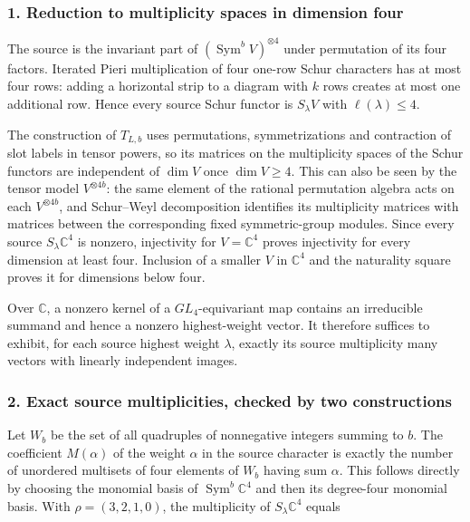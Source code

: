 \documentclass[
  10pt,
]{article}
\begin{document}
\subsubsection{1. Reduction to multiplicity spaces in dimension
four}\label{reduction-to-multiplicity-spaces-in-dimension-four}

The source is the invariant part of
\((\operatorname{Sym}^b V)^{\otimes4}\) under permutation of its four
factors. Iterated Pieri multiplication of four one-row Schur characters
has at most four rows: adding a horizontal strip to a diagram with \(k\)
rows creates at most one additional row. Hence every source Schur
functor is \(S_\lambda V\) with \(\ell(\lambda)\le4\).

The construction of \(T_{L,b}\) uses permutations, symmetrizations and
contraction of slot labels in tensor powers, so its matrices on the
multiplicity spaces of the Schur functors are independent of \(\dim V\)
once \(\dim V\ge4\). This can also be seen by the tensor model
\(V^{\otimes4b}\): the same element of the rational permutation algebra
acts on each \(V^{\otimes4b}\), and Schur--Weyl decomposition identifies
its multiplicity matrices with matrices between the corresponding fixed
symmetric-group modules. Since every source \(S_\lambda\mathbb C^4\) is
nonzero, injectivity for \(V=\mathbb C^4\) proves injectivity for every
dimension at least four. Inclusion of a smaller \(V\) in \(\mathbb C^4\)
and the naturality square proves it for dimensions below four.

Over \(\mathbb C\), a nonzero kernel of a \(GL_4\)-equivariant map
contains an irreducible summand and hence a nonzero highest-weight
vector. It therefore suffices to exhibit, for each source highest weight
\(\lambda\), exactly its source multiplicity many vectors with linearly
independent images.

\subsubsection{2. Exact source multiplicities, checked by two
constructions}\label{exact-source-multiplicities-checked-by-two-constructions}

Let \(W_b\) be the set of all quadruples of nonnegative integers summing
to \(b\). The coefficient \(M(\alpha)\) of the weight \(\alpha\) in the
source character is exactly the number of unordered multisets of four
elements of \(W_b\) having sum \(\alpha\). This follows directly by
choosing the monomial basis of \(\operatorname{Sym}^b\mathbb C^4\) and
then its degree-four monomial basis. With \(\rho=(3,2,1,0)\), the
multiplicity of \(S_\lambda\mathbb C^4\) equals
\end{document}
